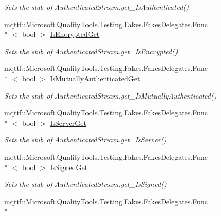 \begin{DoxyCompactItemize}
\begin{DoxyCompactList}\small\item\em Sets the stub of Authenticated\-Stream.\-get\-\_\-\-Is\-Authenticated()\end{DoxyCompactList}\item 
mqttf\-::\-Microsoft.\-Quality\-Tools.\-Testing.\-Fakes.\-Fakes\-Delegates.\-Func\\*
$<$ bool $>$ \hyperlink{class_system_1_1_net_1_1_security_1_1_fakes_1_1_stub_authenticated_stream_a7ff19c6b1de0fc4f344a2a861ea06a15}{Is\-Encrypted\-Get}
\begin{DoxyCompactList}\small\item\em Sets the stub of Authenticated\-Stream.\-get\-\_\-\-Is\-Encrypted()\end{DoxyCompactList}\item 
mqttf\-::\-Microsoft.\-Quality\-Tools.\-Testing.\-Fakes.\-Fakes\-Delegates.\-Func\\*
$<$ bool $>$ \hyperlink{class_system_1_1_net_1_1_security_1_1_fakes_1_1_stub_authenticated_stream_aef261d7fa39200c1a988b08cc1833fbc}{Is\-Mutually\-Authenticated\-Get}
\begin{DoxyCompactList}\small\item\em Sets the stub of Authenticated\-Stream.\-get\-\_\-\-Is\-Mutually\-Authenticated()\end{DoxyCompactList}\item 
mqttf\-::\-Microsoft.\-Quality\-Tools.\-Testing.\-Fakes.\-Fakes\-Delegates.\-Func\\*
$<$ bool $>$ \hyperlink{class_system_1_1_net_1_1_security_1_1_fakes_1_1_stub_authenticated_stream_a2a88efd9bac2f9551ad3cd73d0b023ca}{Is\-Server\-Get}
\begin{DoxyCompactList}\small\item\em Sets the stub of Authenticated\-Stream.\-get\-\_\-\-Is\-Server()\end{DoxyCompactList}\item 
mqttf\-::\-Microsoft.\-Quality\-Tools.\-Testing.\-Fakes.\-Fakes\-Delegates.\-Func\\*
$<$ bool $>$ \hyperlink{class_system_1_1_net_1_1_security_1_1_fakes_1_1_stub_authenticated_stream_aed4f1421b66101b1ebfcae5c6a98aedb}{Is\-Signed\-Get}
\begin{DoxyCompactList}\small\item\em Sets the stub of Authenticated\-Stream.\-get\-\_\-\-Is\-Signed()\end{DoxyCompactList}\item 
mqttf\-::\-Microsoft.\-Quality\-Tools.\-Testing.\-Fakes.\-Fakes\-Delegates.\-Func\\*

\end{DoxyCompactItemize}
